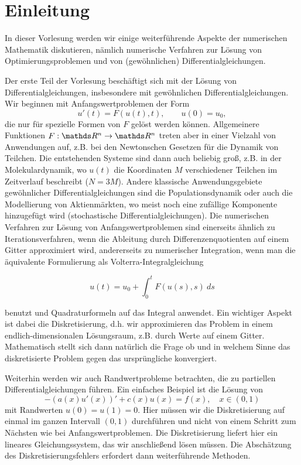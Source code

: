 \chapter{Einleitung}

In dieser Vorlesung werden wir einige weiterführende Aspekte der numerischen Mathematik diskutieren, nämlich numerische Verfahren zur Lösung von Optimierungsproblemen und von (gewöhnlichen) Differentialgleichungen.

Der erste Teil der Vorlesung beschäftigt sich mit der Lösung von Differentialgleichungen, insbesondere mit gewöhnlichen Differentialgleichungen.
Wir beginnen mit Anfangswertproblemen der Form
$$ u'(t) = F(u(t),t), \qquad u(0)=u_0, $$
die nur für spezielle Formen von $F$ gelöst werden können. 
Allgemeinere Funktionen $F:\R^n \rightarrow \R^n$ treten aber in einer Vielzahl von Anwendungen auf, z.B. bei den Newtonschen Gesetzen für die Dynamik von Teilchen. Die entstehenden Systeme sind dann auch beliebig groß, z.B. in der Molekulardynamik, wo $u(t)$ die Koordinaten $M$ verschiedener Teilchen im Zeitverlauf beschreibt ($N=3M$). 
Andere klassische Anwendungsgebiete gewöhnlicher Differentialgleichungen sind die Populationsdynamik oder auch die Modellierung von Aktienmärkten, wo meist noch eine zufällige Komponente hinzugefügt wird (stochastische Differentialgleichungen). 
Die numerischen Verfahren zur Lösung von Anfangswertproblemen sind einerseits ähnlich zu Iterationsverfahren, wenn die Ableitung durch Differenzenquotienten auf einem Gitter approximiert wird, andererseits zu numerischer Integration, wenn man die äquivalente Formulierung als Volterra-Integralgleichung

\begin{equation*}
u(t) = u_0 + \int_0^t F(u(s),s)~ds
\end{equation*}

benutzt und Quadraturformeln auf das Integral anwendet. 
Ein wichtiger Aspekt ist dabei die Diskretisierung, d.h. wir approximieren das Problem in einem  endlich-dimensionalen Lösungsraum, z.B. durch Werte auf einem Gitter. 
Mathematisch stellt sich dann natürlich die Frage ob und in welchem Sinne das diskretisierte Problem gegen das ursprüngliche konvergiert. 

Weiterhin werden wir auch Randwertprobleme betrachten, die zu partiellen Differentialgleichungen führen. Ein einfaches Beispiel ist die Lösung von
$$ - (a(x) u'(x))' + c(x) u(x) = f(x),  \quad x \in (0,1) $$
mit Randwerten $u(0)=u(1)=0$. 
Hier müssen wir die Diskretisierung auf einmal im ganzen Intervall $(0,1)$ durchführen und nicht von einem Schritt zum Nächsten wie bei Anfangswertproblemen. 
Die Diskretisierung liefert hier ein lineares Gleichungssystem, das wir anschlie{\ss}end lösen müssen. 
Die Abschätzung des Diskretisierungsfehlers erfordert dann weiterführende Methoden. 

